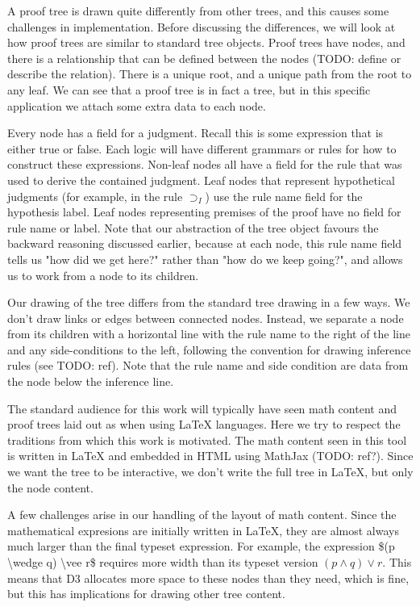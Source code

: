 \documentclass[conference]{IEEEtran}
\begin{document}
A proof tree is drawn quite differently from other trees, and this causes some challenges in implementation. Before discussing the differences, we will look at how proof trees are similar to standard tree objects. Proof trees have nodes, and there is a relationship that can be defined between the nodes (TODO: define or describe the relation). There is a unique root, and a unique path from the root to any leaf. We can see that a proof tree is in fact a tree, but in this specific application we attach some extra data to each node.

Every node has a field for a judgment. Recall this is some expression that is either true or false. Each logic will have different grammars or rules for how to construct these expressions. Non-leaf nodes all have a field for the rule that was used to derive the contained judgment. Leaf nodes that represent hypothetical judgments (for example, in the rule $\supset_I$) use the rule name field for the hypothesis label. Leaf nodes representing premises of the proof have no field for rule name or label. Note that our abstraction of the tree object favours the backward reasoning discussed earlier, because at each node, this rule name field tells us "how did we get here?" rather than "how do we keep going?", and allows us to work from a node to its children.

Our drawing of the tree differs from the standard tree drawing in a few ways. We don't draw links or edges between connected nodes. Instead, we separate a node from its children with a horizontal line with the rule name to the right of the line and any side-conditions to the left, following the convention for drawing inference rules (see TODO: ref). Note that the rule name and side condition are data from the node below the inference line.

The standard audience for this work will typically have seen math content and proof trees laid out as when using \LaTeX{} languages. Here we try to respect the traditions from which this work is motivated. The math content seen in this tool is written in \LaTeX{} and embedded in HTML using MathJax (TODO: ref?). Since we want the tree to be interactive, we don't write the full tree in \LaTeX{}, but only the node content.

A few challenges arise in our handling of the layout of math content. Since the mathematical expresions are initially written in \LaTeX{}, they are almost always much larger than the final typeset expression. For example, the expression \$(p \textbackslash wedge q) \textbackslash vee r\$ requires more width than its typeset version $(p \wedge q) \vee r$. This means that D3 allocates more space to these nodes than they need, which is fine, but this has implications for drawing other tree content.
\end{document}
